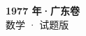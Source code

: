 \documentclass[zihao=-4, a4paper]{ctexart}
\begin{document}
\begin{center}
  {\Large\bfseries 1977 年·广东卷}\\[4pt]
  {\large 数学 · 试题版}
\end{center}
\medskip
{}

\end{document}
